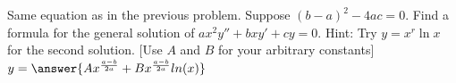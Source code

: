 \documentclass{ximera}
\begin{document}
\begin{exercise} \label{sol:eulerexln}
    Same equation as in the previous problem. Suppose ${(b-a)}^2-4ac = 0$.  Find a formula for the general solution of $a x^2 y'' + b x y' + c y = 0$.  Hint: Try $y=x^r \ln x$ for the second solution. [Use $A$ and $B$ for your arbitrary constants] $y = \answer{Ax^{\frac{a-b}{2a}} + Bx^{\frac{a-b}{2a}}ln(x)}$
\end{exercise}


\end{document}
